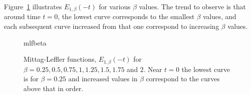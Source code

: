 Figure~\ref{fig:mlfbeta} illustrates $E_{1,\beta}(-t)$ for various $\beta$ values. The trend to observe is that around time $t=0$, the lowest curve corresponds to the smallest $\beta$ values, and each subsequent curve increased from that one correspond to increasing $\beta$ values. 

\begin{figure}
  \centering
  {mlfbeta}
  \caption{Mittag-Leffler functions, $E_{1, \beta}(-t)$ for $\beta = 0.25, 0.5, 0.75, 1, 1.25, 1.5, 1.75$ and $2$. Near $t=0$ the lowest curve is for $\beta = 0.25$ and increased values in $\beta$ correspond to the curves above that in order.}
  \label{fig:mlfbeta}
\end{figure}


